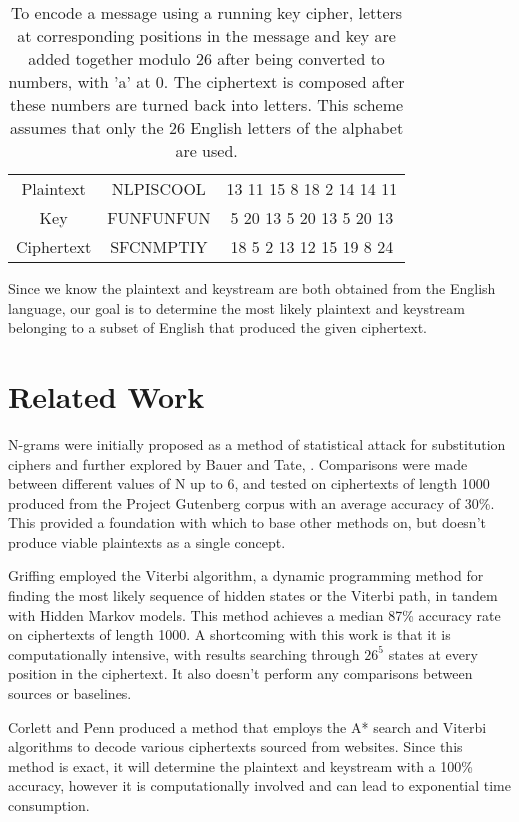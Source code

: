 \documentclass[11pt,letterpaper]{article}
\begin{document}
\begin{table*}[t]
	\centering
	\caption{To encode a message using a running key cipher, letters at corresponding positions in the message and key are added together modulo 26 after being converted to numbers, with 'a' at 0. The ciphertext is composed after these numbers are turned back into letters. This scheme assumes that only the 26 English letters of the alphabet are used.}
	\begin{tabular}{|c|c|c|}
		\hline
		Plaintext & NLPISCOOL & 13 11 15 8 18 2 14 14 11\\
		Key & FUNFUNFUN & 5 20 13 5 20 13 5 20 13\\
		Ciphertext & SFCNMPTIY & 18 5 2 13 12 15 19 8 24\\
		\hline
	\end{tabular}
\label{tab:1}
\end{table*}
Since we know the plaintext and keystream are both obtained from the English language, our goal is to determine the most likely plaintext and keystream belonging to a subset of English that produced the given ciphertext. 

\section{Related Work}

N-grams were initially proposed as a method of statistical attack for substitution ciphers and further explored by Bauer and Tate, \cite{Bauer:02}. Comparisons were made between different values of N up to 6, and tested on ciphertexts of length 1000 produced from the Project Gutenberg corpus with an average accuracy of 30\%. This provided a foundation with which to base other methods on, but doesn't produce viable plaintexts as a single concept.

Griffing \cite{Griffing:06} employed the Viterbi algorithm, a dynamic programming method for finding the most likely sequence of hidden states or the Viterbi path, in tandem with Hidden Markov models. This method achieves a median 87\% accuracy rate on ciphertexts of length 1000. A shortcoming with this work is that it is computationally intensive, with results searching through $26^5$ states at every position in the ciphertext. It also doesn't perform any comparisons between sources or baselines.

Corlett and Penn \cite{Corlett:10} produced a method that employs the A* search and Viterbi algorithms to decode various ciphertexts sourced from websites. Since this method is exact, it will determine the plaintext and keystream with a 100\% accuracy, however it is computationally involved and can lead to exponential time consumption.
\end{document}
